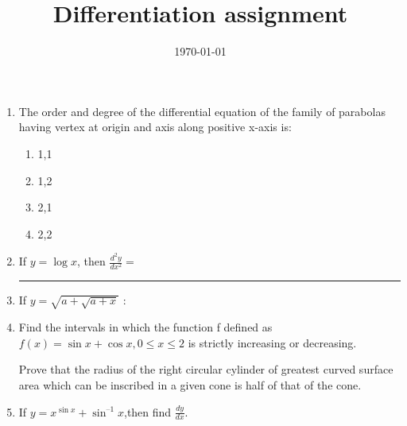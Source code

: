 \documentclass[12pt]{article}
\title{Differentiation assignment}
\date{\today}
\begin{document}

\begin{enumerate}

\item The order and degree of the differential equation of the family of parabolas having vertex at origin and axis along positive x-axis is:


\begin{enumerate}
\item 1,1
\item 1,2
\item 2,1
\item 2,2
\end{enumerate}

\item If $y = \log x$, then $\frac{d^2y}{dx^2}=$ \rule{30pt}{1pt}

\item If $y=\sqrt{a+\sqrt{a+x}}$ :

\item Find the intervals in which the function f defined as $f(x) = \sin x + \cos x, 0\le x \le 2$ is strictly increasing or decreasing.

Prove that the radius of the right circular cylinder of greatest curved surface area which can be inscribed in a given cone is half of that of the cone.
\item If $y=x^{\sin x}+\sin^{–1}x$,then find $\frac{dy}{dx}$.
\end{enumerate}
\end{document}
